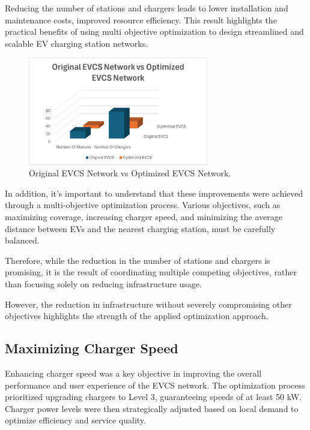 Reducing the number of stations and chargers leads to lower installation and maintenance costs, improved resource efficiency. This result highlights the practical benefits of using multi objective optimization to design streamlined and scalable EV charging station networks.


\begin{figure}[h!]
    \centering
    \includegraphics[width=0.7\textwidth]{../Figures/Original_vs_Optimized_evcs_network.png}
    \caption{Original EVCS Network vs Optimized EVCS Network.}
    \label{fig:Stations_Chargers}
\end{figure}

In addition, it's important to understand that these improvements were achieved through a multi-objective optimization process. Various objectives, such as maximizing coverage, increasing charger speed, and minimizing the average distance between EVs and the nearest charging station, must be carefully balanced.

Therefore, while the reduction in the number of stations and chargers is promising, it is the result of coordinating multiple competing objectives, rather than focusing solely on reducing infrastructure usage.

However, the reduction in infrastructure without severely compromising other objectives highlights the strength of the applied optimization approach. 

\subsection{Maximizing Charger Speed}

Enhancing charger speed was a key objective in improving the overall performance and user experience of the EVCS network. The optimization process prioritized upgrading chargers to Level 3, guaranteeing speeds of at least 50 kW. Charger power levels were then strategically adjusted based on local demand to optimize efficiency and service quality.

